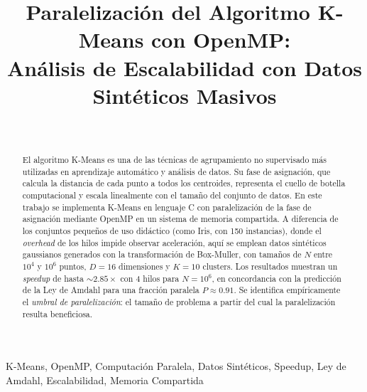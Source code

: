 \documentclass[conference]{IEEEtran}
\begin{document}
\title{\LARGE Paralelizaci\'on del Algoritmo K-Means con OpenMP:\\
       An\'alisis de Escalabilidad con Datos Sint\'eticos Masivos}

\author{%
  \\[4pt]
}

\maketitle

\renewcommand{\abstractname}{Resumen}
\begin{abstract}
El algoritmo K-Means es una de las t\'ecnicas de agrupamiento no supervisado
m\'as utilizadas en aprendizaje autom\'atico y an\'alisis de datos.
Su fase de asignaci\'on, que calcula la distancia de cada punto a todos los
centroides, representa el cuello de botella computacional y escala linealmente
con el tama\~no del conjunto de datos.
En este trabajo se implementa K-Means en lenguaje C con paralelizaci\'on de
la fase de asignaci\'on mediante OpenMP en un sistema de memoria compartida.
A diferencia de los conjuntos peque\~nos de uso did\'actico (como Iris, con
150 instancias), donde el \emph{overhead} de los hilos impide observar
aceleraci\'on, aqu\'i se emplean datos sint\'eticos gaussianos generados con
la transformaci\'on de Box-Muller, con tama\~nos de $N$ entre $10^4$ y $10^6$
puntos, $D{=}16$ dimensiones y $K{=}10$ clusters.
Los resultados muestran un \emph{speedup} de hasta $\sim 2.85\times$ con 4
hilos para $N{=}10^6$, en concordancia con la predicci\'on de la Ley de
Amdahl para una fracci\'on paralela $P \approx 0.91$.
Se identifica emp\'iricamente el \emph{umbral de paralelizaci\'on}: el
tama\~no de problema a partir del cual la paralelizaci\'on resulta
beneficiosa.
\end{abstract}
\renewcommand{\IEEEkeywordsname}{Palabras clave}
\begin{IEEEkeywords}
K-Means, OpenMP, Computaci\'on Paralela, Datos Sint\'eticos, Speedup,
Ley de Amdahl, Escalabilidad, Memoria Compartida
\end{IEEEkeywords}
\end{document}
